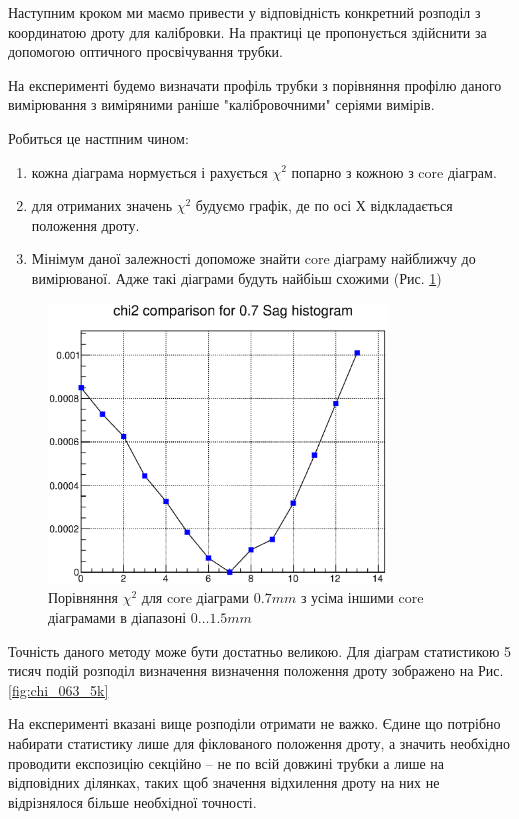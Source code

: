 \documentclass[]{article}
\begin{document}
	Наступним кроком ми маємо привести у відповідність конкретний розподіл з координатою дроту для калібровки. На практиці це пропонується здійснити за допомогою оптичного просвічування трубки.
	
	На експерименті будемо визначати профіль трубки з порівняння профілю даного вимірювання з виміряними раніше "калібровочними" серіями вимірів.
	
	Робиться це настпним чином:
	\begin{enumerate}
		\item кожна діаграма нормується і рахується $\chi^2$ попарно з кожною з core діаграм. 
		\item для отриманих значень $\chi^2$ будуємо графік, де по осі Х відкладається положення дроту.
		\item Мінімум даної залежності допоможе знайти core діаграму найближчу до вимірюваної. Адже такі діаграми будуть найбіьш схожими (Рис. \ref{fig:chi2for07})
	\end{enumerate}
	
	\begin{figure}
	\centering
	\includegraphics[width=0.8\textwidth]{chi2_07}
	\caption{ Порівняння $\chi^2$ для core діаграми $0.7 mm$ з усіма іншими core діаграмами в діапазоні $0\dots 1.5 mm$}
	\label{fig:chi2for07}	
	\end{figure}
	
	Точність даного методу може бути достатньо великою. Для діаграм статистикою 5 тисяч подій розподіл визначення визначення положення дроту зображено на Рис. \ref{fig:chi_063_5k}
	
	На експерименті вказані вище розподіли отримати не важко. Єдине що потрібно набирати статистику лише для фіклованого положення дроту, а значить необхідно проводити експозицію секційно -- не по всій довжині трубки а лише на відповідних ділянках, таких щоб значення відхилення дроту на них не відрізнялося більше необхідної точності.
	
\end{document}
